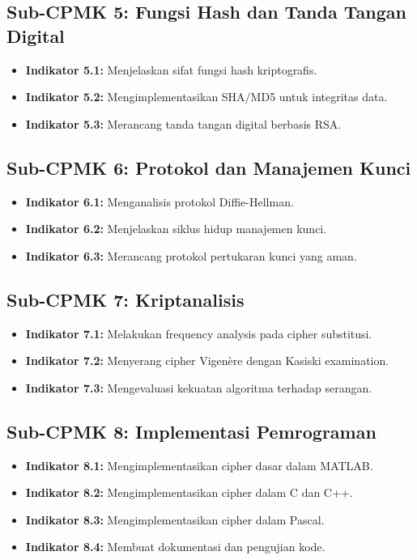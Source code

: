 \documentclass[12pt,a4paper]{article}
\begin{document}
\subsection{Sub-CPMK 5: Fungsi Hash dan Tanda Tangan Digital}
\begin{itemize}
\item \textbf{Indikator 5.1:} Menjelaskan sifat fungsi hash kriptografis.
\item \textbf{Indikator 5.2:} Mengimplementasikan SHA/MD5 untuk integritas data.
\item \textbf{Indikator 5.3:} Merancang tanda tangan digital berbasis RSA.
\end{itemize}

\subsection{Sub-CPMK 6: Protokol dan Manajemen Kunci}
\begin{itemize}
\item \textbf{Indikator 6.1:} Menganalisis protokol Diffie-Hellman.
\item \textbf{Indikator 6.2:} Menjelaskan siklus hidup manajemen kunci.
\item \textbf{Indikator 6.3:} Merancang protokol pertukaran kunci yang aman.
\end{itemize}

\subsection{Sub-CPMK 7: Kriptanalisis}
\begin{itemize}
\item \textbf{Indikator 7.1:} Melakukan frequency analysis pada cipher substitusi.
\item \textbf{Indikator 7.2:} Menyerang cipher Vigenère dengan Kasiski examination.
\item \textbf{Indikator 7.3:} Mengevaluasi kekuatan algoritma terhadap serangan.
\end{itemize}

\subsection{Sub-CPMK 8: Implementasi Pemrograman}
\begin{itemize}
\item \textbf{Indikator 8.1:} Mengimplementasikan cipher dasar dalam MATLAB.
\item \textbf{Indikator 8.2:} Mengimplementasikan cipher dalam C dan C++.
\item \textbf{Indikator 8.3:} Mengimplementasikan cipher dalam Pascal.
\item \textbf{Indikator 8.4:} Membuat dokumentasi dan pengujian kode.
\end{itemize}
\end{document}
